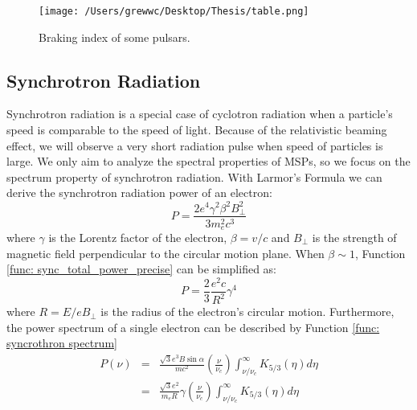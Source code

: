 \documentclass[12pt]{report}
\begin{document}
        \begin{figure}[!ht]
          \centering
          \texttt{[image: /Users/grewwc/Desktop/Thesis/table.png]}
          \caption{Braking index of some pulsars.}
          \label{fig:braking_index}
        \end{figure}
    
        \subsection{Synchrotron Radiation}
          Synchrotron radiation is a special case of cyclotron radiation when a particle's
          speed is comparable to the speed of light. Because of the relativistic beaming 
          effect, we will observe a very short radiation pulse when speed of particles is 
          large. We only aim to analyze the spectral properties of MSPs, so we focus on the 
          spectrum property of synchrotron radiation. 
          With Larmor's Formula we can derive the synchrotron radiation power of an electron:
          \begin{equation}
            \label{func: sync_total_power_precise}
            P = \frac{2e^4\gamma^2\beta^2B_{\perp}^2}{3m_e^2c^3} 
          \end{equation}
          where $\gamma$ is the Lorentz factor of the electron, $\beta=v/c$ and $B_{\perp}$ 
          is the strength of magnetic field perpendicular to the circular motion plane. 
          When $\beta \sim 1$, Function \ref{func: sync_total_power_precise} can be 
          simplified as:
          \begin{equation}
            \label{func: sync_total_power_simplified}
            P = \frac{2}{3}\frac{e^2c}{R^2}\gamma^4
          \end{equation}
          where $R = E / e B_{\perp}$ is the radius of the electron's circular motion. 
          Furthermore, the power spectrum of a single electron  
          can be described by Function \ref{func: syncrothron spectrum}
          \begin{eqnarray}
          \label{func: syncrothron spectrum}
            P\left(\nu\right) &=& \frac{\sqrt{3} e^3 B \sin{\alpha}}{m c^2} 
              \left(\frac{\nu}{\nu_c}\right) \int_{\nu / \nu_c}^{\infty} K_{5/3}\left(\eta \right)d\eta  \nonumber \\
              &=& \frac{\sqrt{3}e^2}{m_eR}\gamma \left(\frac{\nu}{\nu_c}\right) \int_{\nu / \nu_c}^{\infty} K_{5/3}\left(\eta \right)d\eta
          \end{eqnarray}
\end{document}
